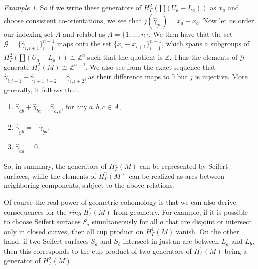 \documentclass[12pt]{article}
\theoremstyle{plain}
\theoremstyle{definition}
\theoremstyle{remark}
\newtheorem{example}[theorem]{Example}
\newcommand{\Z}{\mathbb{Z}}
\newcommand{\mc}[1]{\mathcal{#1}}
\begin{document}
\begin{example}
So if we write these generators of $H^2_\Gamma(\amalg(U_a-L_a))$ as $\underline{x_a}$ and choose consistent co-orientations, we see that $j(\underline{\hat \gamma_{ab}}) = \underline{x_a} - \underline{x_b}$.
Now let us order our indexing set $A$ and relabel as $A = \{1, \ldots , n\}$.
We then have that the set $\mc G = \{\underline{\hat \gamma_{i,i+1}}\}_{i=1}^{n-1}$ maps onto the set $\{\underline{x_i}-\underline{x_{i+1}}\}_{i=1}^{n-1}$, which spans a subgroups of $H^2_\Gamma(\amalg(U_a-L_a)) \cong \Z^n$ such that the quotient is $\Z$.
Thus the elements of $\mc G$ generate $H^2_\Gamma(M) \cong \Z^{n-1}$.
We also see from the exact sequence that $\underline{\hat \gamma_{i,i+1}}+\underline{\hat \gamma_{i+1,i+2}} = \underline{\hat \gamma_{i, i+2}}$, as their difference maps to $0$ but $j$ is injective.
More generally, it follows that:
\begin{enumerate}
\item $\underline{\hat \gamma_{ab}} + \underline{\hat \gamma_{bc}} =\underline{\hat \gamma_{a,c}}$, for any $a,b,c \in A$,
\item $\underline{\hat \gamma_{ab}} = -\underline{\hat \gamma_{ba}}$,
\item $\underline{\hat \gamma_{aa}}=0$.
\end{enumerate}


So, in summary, the generators of $H^1_\Gamma(M)$ can be represented by Seifert surfaces, while the elements of $H^2_\Gamma(M)$ can be realized as arcs between neighboring components, subject to the above relations.

Of course the real power of geometric cohomology is that we can also derive consequences for the \emph{ring} $H^*_\Gamma(M)$ from geometry.
For example, if it is possible to choose Seifert surfaces $S_a$ simultaneously for all $a$ that are disjoint or intersect only in closed curves, then all cup product on $H^1_\Gamma(M)$ vanish.
On the other hand, if two Seifert surfaces $S_a$ and $S_b$ intersect in just an arc between $L_a$ and $L_b$, then this corresponds to the cup product of two generators of $H^1_\Gamma(M)$ being a generator of $H^2_\Gamma(M)$.


\end{example}
\end{document}
